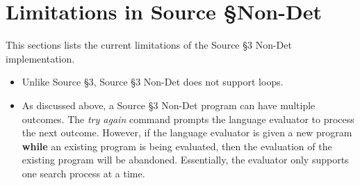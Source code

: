 

\newpage



\newpage





























\section*{Limitations in Source \S Non-Det}
This sections lists the current limitations of the Source \S 3 Non-Det implementation.

\begin{itemize}
\item Unlike Source \S 3, Source \S 3 Non-Det does not support loops.
\item As discussed above, a Source \S 3 Non-Det program can have multiple outcomes. The \emph{try again} command 
prompts the language evaluator to process the next outcome. However, if the language evaluator is given a new program \textbf{while} an existing program is being evaluated, then the evaluation of the existing program will be abandoned.
Essentially, the evaluator only supports one search process at a time.
\end{itemize}


\newpage



\newpage



\newpage



    
